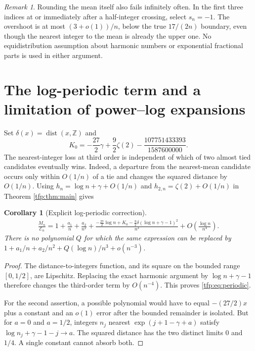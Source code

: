 \documentclass[11pt,a4paper]{article}
\numberwithin{equation}{section}
\newtheorem{corollary}[theorem]{Corollary}
\theoremstyle{definition}\newtheorem{definition}[theorem]{Definition}
\theoremstyle{remark}\newtheorem{remark}[theorem]{Remark}
\newcommand{\Z}{\mathbb Z}\newcommand{\R}{\mathbb R}
\newcommand{\dist}{\operatorname{dist}}
\newcommand{\calE}{\mathcal E}
\begin{document}
\begin{remark}
Rounding the mean itself also fails infinitely often. In the first
three indices at or immediately after a half-integer crossing, select
$s_n=-1$. The overshoot is at most $(3+o(1))/n$, below the true
$17/(2n)$ boundary, even though the nearest integer to the mean is
already the upper one. No equidistribution assumption about harmonic
numbers or exponential fractional parts is used in either argument.
\end{remark}

\section{The log-periodic term and a limitation of power--log expansions}
\label{tfp:sec:logperiodic}
Set $\delta(x)=\dist(x,\Z)$ and
\begin{equation}
 K_0=-\frac{27}{2}\gamma+\frac92\zeta(2)
             -\frac{107751433393}{1587600000}.
\end{equation}
The nearest-integer loss at third order is independent of which of
two almost tied candidates eventually wins. Indeed, a departure from
the nearest-mean candidate occurs only within $O(1/n)$ of a tie and
changes the squared distance by $O(1/n)$.
Using $h_n=\log n+\gamma+O(1/n)$ and
$h_{2,n}=\zeta(2)+O(1/n)$ in Theorem \ref{tfp:thm:main} gives
\begin{corollary}[Explicit log-periodic correction]\label{tfp:cor:periodic}
\begin{equation}\label{tfp:eq:periodic}
\begin{split}
 \frac{M_n}{\calE_n}
 =1+\frac{a_1}{n}+\frac{a_2}{n^2}
 +\frac{-\frac{27}{2}\log n+K_0
          -\frac92\delta(\log n+\gamma-1)^2}{n^3}
 +O\!\left(\frac{\log n}{n^4}\right).
\end{split}
\end{equation}
There is no polynomial $Q$ for which the same expression can be
replaced by
$1+a_1/n+a_2/n^2+Q(\log n)/n^3+o(n^{-3})$.
\end{corollary}
\begin{proof}
The distance-to-integers function, and its square on the bounded range
$[0,1/2]$, are Lipschitz. Replacing the exact harmonic argument by
$\log n+\gamma-1$ therefore changes the third-order term by $O(n^{-4})$.
This proves \eqref{tfp:eq:periodic}.

For the second assertion, a possible polynomial would have to equal
$-(27/2)x$ plus a constant and an $o(1)$ error after the bounded
remainder is isolated. But for $a=0$ and $a=1/2$, integers $n_j$ nearest
$\exp(j+1-\gamma+a)$ satisfy
$\log n_j+\gamma-1-j\to a$. The squared distance has the two distinct
limits $0$ and $1/4$. A single constant cannot absorb both.
\end{proof}
\end{document}
